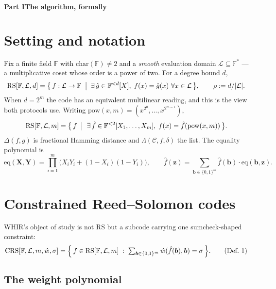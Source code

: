 \documentclass[11pt,a4paper]{article}
\newcommand{\eqp}{\mathrm{eq}}
\newcommand{\RS}{\mathrm{RS}}
\newcommand{\CRS}{\mathrm{CRS}}
\newcommand{\pow}{\mathrm{pow}}
\begin{document}
\vspace{1em}

\begin{center}{\large\bfseries Part I\quad The algorithm, formally}\end{center}
\vspace{-0.5em}
\noindent{\color{rule}\rule{\linewidth}{0.6pt}}

\section{Setting and notation}

Fix a finite field $\mathbb{F}$ with $\mathrm{char}(\mathbb{F})\neq 2$ and a \emph{smooth}
evaluation domain $\mathcal{L}\subseteq\mathbb{F}^{*}$ --- a multiplicative coset whose order is a
power of two. For a degree bound $d$,
\[
  \RS[\mathbb{F},\mathcal{L},d]
  = \bigl\{\, f:\mathcal{L}\to\mathbb{F} \;\bigm|\; \exists\,\hat g\in\mathbb{F}^{<d}[X],\;
    f(x)=\hat g(x)\ \forall x\in\mathcal{L} \,\bigr\},
  \qquad \rho := d/|\mathcal{L}| .
\]
When $d=2^{m}$ the code has an equivalent multilinear reading, and this is the view both protocols
use. Writing $\pow(x,m)=(x^{2^{0}},\dots,x^{2^{m-1}})$,
\[
  \RS[\mathbb{F},\mathcal{L},m]
  = \bigl\{\, f \;\bigm|\; \exists\,\hat f\in\mathbb{F}^{<2}[X_{1},\dots,X_{m}],\;
    f(x)=\hat f(\pow(x,m)) \,\bigr\}.
\]
$\Delta(f,g)$ is fractional Hamming distance and $\Lambda(\mathcal{C},f,\delta)$ the list. The
equality polynomial is
\[
  \eqp(\boldsymbol X,\boldsymbol Y)=\prod_{i=1}^{m}\bigl(X_{i}Y_{i}+(1-X_{i})(1-Y_{i})\bigr),
  \qquad
  \hat f(\boldsymbol z)=\sum_{\boldsymbol b\in\{0,1\}^{m}}\hat f(\boldsymbol b)\cdot
  \eqp(\boldsymbol b,\boldsymbol z).
\]

\section{Constrained Reed--Solomon codes}\label{sec:crs}

WHIR's object of study is not $\RS$ but a subcode carrying one sumcheck-shaped constraint:
\[
  \CRS[\mathbb{F},\mathcal{L},m,\hat w,\sigma]
  = \Bigl\{\, f\in\RS[\mathbb{F},\mathcal{L},m] \;:\;
  \textstyle\sum_{\boldsymbol b\in\{0,1\}^{m}}\hat w(\hat f(\boldsymbol b),\boldsymbol b)=\sigma
  \,\Bigr\}.
  \tag{Def.\ 1}
\]
\subsection*{The weight polynomial}
\end{document}
